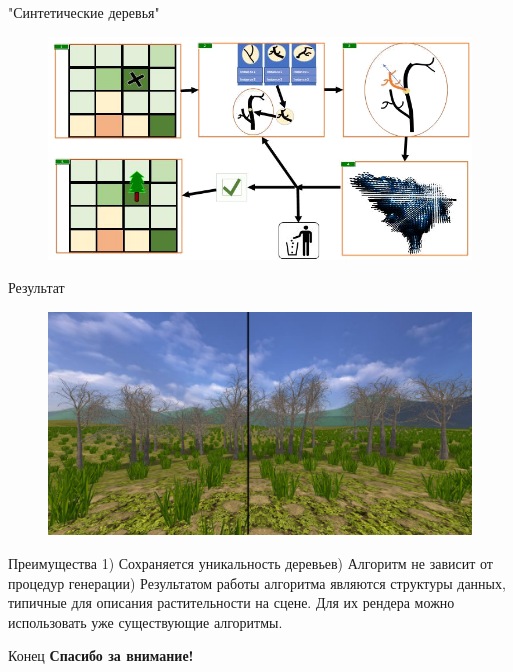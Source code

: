 \documentclass[14pt]{beamer}
\begin{document}
\begin{frame}{"Синтетические деревья"}
\begin{figure}[hbtp]
\includegraphics[scale=0.57]{Synts.png}
\end{figure}
\end{frame}
\begin{frame}{Результат}	
\begin{figure}[hbtp]
\includegraphics[scale=0.18]{synt_comparison_1.png}
\end{figure}
\end{frame}
\begin{frame}{Преимущества}
1) Сохраняется уникальность деревьев) Алгоритм не зависит от процедур генерации) Результатом работы алгоритма являются структуры данных, типичные для описания растительности на сцене. Для их рендера можно использовать уже существующие алгоритмы.
\end{frame}

\begin{frame}{Конец}
\textbf{			Спасибо за внимание!}
\end{frame}
\end{document}
